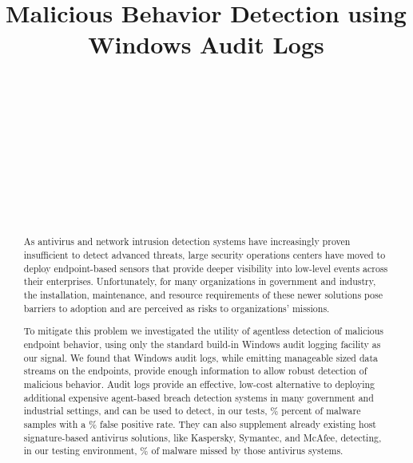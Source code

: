 \documentclass{sig-alternate-2013}
\begin{document}
\title{Malicious Behavior Detection using Windows Audit Logs}


\author{
\\
       \\
       \\
\\
       \\
       \\
 \\
       \\
       \\
}

\maketitle

\begin{abstract}
As antivirus and network intrusion detection systems have increasingly proven insufficient to detect advanced threats, large security operations centers have moved to deploy end\-point-based sensors that provide deeper visibility into low-level events across their enterprises. Unfortunately, for many organizations in government and industry, the installation, maintenance, and resource requirements of these newer solutions pose barriers to adoption and are perceived as risks to organizations' missions.

To mitigate this problem we investigated the utility of agentless detection of malicious endpoint behavior, using only the standard build-in Windows audit logging facility as our signal. We found that Windows audit logs, while emitting manageable sized data streams on the endpoints, provide enough information to allow robust detection of malicious behavior. Audit logs provide an effective, low-cost alternative to deploying additional expensive agent-based breach detection systems in many government and industrial settings, and can be used to detect, in our tests, \% percent of malware samples with a \% false positive rate. They can also supplement already existing host signature-based antivirus solutions, like Kaspersky, Symantec, and McAfee, detecting, in our testing environment, \% of malware missed by those antivirus systems.
\end{abstract}
\end{document}

